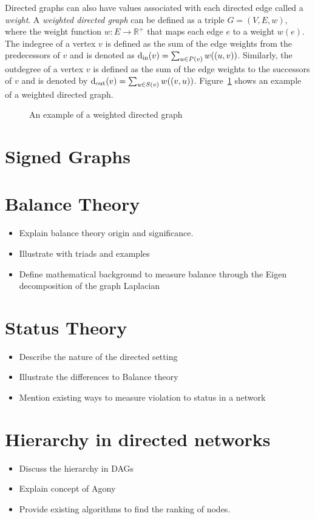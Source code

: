 Directed graphs can also have values associated with each directed edge called a \textit{weight}. A \textit{weighted directed graph} can be defined as a triple $G=(V,E,w)$, where the weight function $w:E \rightarrow \mathbb{R}^{+}$ that maps each edge $e$ to a weight $w(e)$. The indegree of a vertex $v$ is defined as the sum of the edge weights from the predecessors of $v$ and is denoted as $\operatorname*{d_{\text{in}}}(v) = \sum_{u \in P(v)} w((u,v))$. Similarly, the outdegree of a vertex $v$ is defined as the sum of the edge weights to the successors of $v$ and is denoted by $\operatorname*{d_{\text{out}}}(v) = \sum_{u \in S(v)}w((v,u))$.
Figure~\ref{fig:weighted-directed} shows an example of a weighted directed graph.

\begin{figure}[!ht]
    \centering
    
    \caption{An example of a weighted directed graph}
    \label{fig:weighted-directed}
\end{figure}

\section{Signed Graphs}
\label{sec:signed-graphs}


\section{Balance Theory}
\label{sec:balance-theory}
\begin{itemize}
    \item Explain balance theory origin and significance.
    \item Illustrate with triads and examples
    \item Define mathematical background to measure balance through the Eigen decomposition of the graph Laplacian  
\end{itemize}

\section{Status Theory}
\label{sec:status-theory}
\begin{itemize}
    \item Describe the nature of the directed setting
    \item Illustrate the differences to Balance theory
    \item Mention existing ways to measure violation to status in a network
\end{itemize}

\section{Hierarchy in directed networks}
\label{sec:hierarchy}
\begin{itemize}
    \item Discuss the hierarchy in DAGs
    \item Explain concept of Agony
    \item Provide existing algorithms to find the ranking of nodes.
\end{itemize}